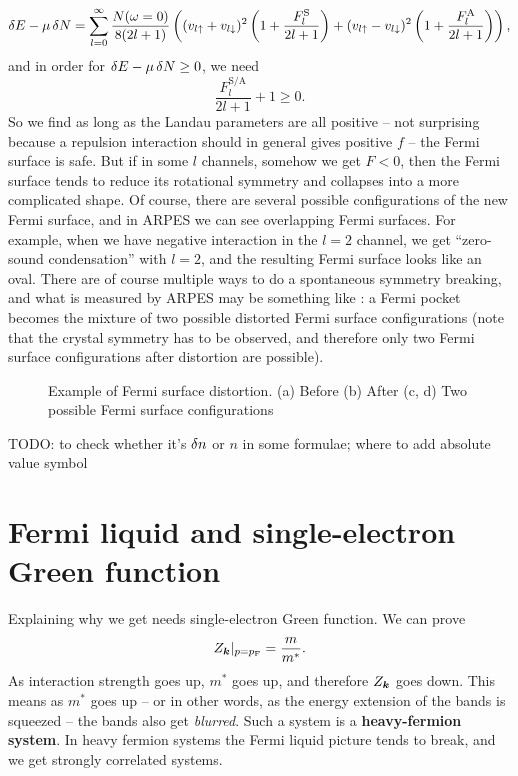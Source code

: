 \documentclass[hyperref, a4paper]{article}
\newcommand*{\concept}[1]{{\textbf{#1}}}
\newcommand*{\pfermi}{p_{\text{F}}}
\begin{document}
\begin{equation}
    \var{E} - \mu \var{N} = 
    \sum_{l=0}^{\infty} \frac{N(\omega = 0)}{8 (2 l + 1)}
    \left(
        (v_{l \uparrow} + v_{l \downarrow})^2 \left(
            1 + \frac{F^{\text{S}}_l}{2 l + 1}
        \right)
        + (v_{l \uparrow} - v_{l \downarrow})^2 \left(
            1 + \frac{F^{\text{A}}_l}{2 l + 1}
        \right)
    \right),
\end{equation}
and in order for $\var{E} - \mu \var{N} \geq 0$, we need 
\begin{equation}
    \frac{F^\text{S/A}_l}{2 l + 1} + 1 \geq 0.
\end{equation}
So we find as long as the Landau parameters are all positive -- 
not surprising because a repulsion interaction should in general gives positive $f$ -- 
the Fermi surface is safe.
But if in some $l$ channels, 
somehow we get $F < 0$,
then the Fermi surface tends to reduce its rotational symmetry
and collapses into a more complicated shape.
Of course, there are several possible configurations of 
the new Fermi surface, 
and in ARPES we can see overlapping Fermi surfaces. 
For example, when we have negative interaction in the $l = 2$ channel, 
we get ``zero-sound condensation'' with $l = 2$, 
and the resulting Fermi surface looks like an oval.
There are of course multiple ways to do a spontaneous symmetry breaking, 
and what is measured by ARPES may be something like 
:
a Fermi pocket becomes the mixture of 
two possible distorted Fermi surface configurations
(note that the crystal symmetry has to be observed, 
and therefore only two Fermi surface configurations
after distortion are possible).

\begin{figure}
    \centering
    
    \caption{Example of Fermi surface distortion. (a) Before (b) After
    (c, d) Two possible Fermi surface configurations}
    \label{fig:fermi-surface-distortion}
\end{figure}

TODO: to check whether it's $\var{n}$ or $n$ in some formulae; 
where to add absolute value symbol

\section{Fermi liquid and single-electron Green function}

Explaining why we get  
needs single-electron Green function.
We can prove 
\begin{equation}
    Z_{\vb*{k}}|_{p = \pfermi} = \frac{m}{m^*}.
\end{equation}
As interaction strength goes up, $m^*$ goes up, 
and therefore $Z_{\vb*{k}}$ goes down.
This means as $m^*$ goes up -- or in other words, 
as the energy extension of the bands is squeezed -- 
the bands also get \emph{blurred}.
Such a system is a \concept{heavy-fermion system}.
In heavy fermion systems the Fermi liquid picture tends to break,
and we get strongly correlated systems.
\end{document}
